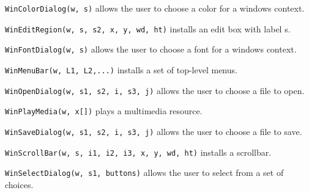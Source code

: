 \texttt{WinColorDialog(w, s)} allows the user to choose a color for a
window{\textquotesingle}s context.

\texttt{WinEditRegion(w, s, s2, x, y, wd, ht)} installs an edit box with label s.

\texttt{WinFontDialog(w, s)} allows the user to choose a font for a
window{\textquotesingle}s context.

\texttt{WinMenuBar(w, L1, L2,...)} installs a set of top-level menus.

\texttt{WinOpenDialog(w, s1, s2, i, s3, j)} allows the user to choose a file to
open.

\texttt{WinPlayMedia(w, x[])} plays a multimedia resource.

\texttt{WinSaveDialog(w, s1, s2, i, s3, j)} allows the user to choose a file to
save.

\texttt{WinScrollBar(w, s, i1, i2, i3, x, y, wd, ht)} installs a scrollbar.

\texttt{WinSelectDialog(w, s1, buttons)} allows the user to select from a set of
choices.

